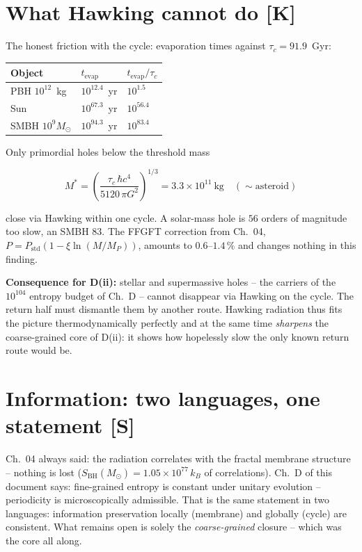 \section{What Hawking cannot do [K]}

The honest friction with the cycle: evaporation times against
$\tau_c = 91.9$~Gyr:

\begin{center}
\begin{tabular}{lll}
\toprule
Object & $t_\text{evap}$ & $t_\text{evap}/\tau_c$ \\
\midrule
PBH $10^{12}$~kg & $10^{12.4}$~yr & $10^{1.5}$ \\
Sun & $10^{67.3}$~yr & $10^{56.4}$ \\
SMBH $10^{9}M_\odot$ & $10^{94.3}$~yr & $10^{83.4}$ \\
\bottomrule
\end{tabular}
\end{center}

Only primordial holes below the threshold mass

\[
  M^{*} = \left(\frac{\tau_c\,\hbar c^4}{5120\,\pi G^2}\right)^{1/3}
  = 3.3\times10^{11}~\text{kg} \quad(\sim\text{asteroid})
\]

close via Hawking within one cycle. A solar-mass hole is $56$
orders of magnitude too slow, an SMBH $83$. The FFGFT correction
from Ch.~04, $P = P_\text{std}(1 - \xi\ln(M/M_P))$, amounts to
$0.6$--$1.4\,\%$ and changes nothing in this finding.

\textbf{Consequence for D(ii):} stellar and supermassive holes --
the carriers of the $10^{104}$ entropy budget of Ch.~D -- cannot
disappear via Hawking on the cycle. The return half must dismantle
them by another route. Hawking radiation thus fits the picture
thermodynamically perfectly and at the same time \emph{sharpens}
the coarse-grained core of D(ii): it shows how hopelessly slow the
only known return route would be.

\section{Information: two languages, one statement [S]}

Ch.~04 always said: the radiation correlates with the fractal
membrane structure -- nothing is lost
($S_\text{BH}(M_\odot) = 1.05\times10^{77}\,k_B$ of
correlations). Ch.~D of this document says: fine-grained entropy
is constant under unitary evolution -- periodicity is
microscopically admissible. That is the same statement in two
languages: information preservation locally (membrane) and
globally (cycle) are consistent. What remains open is solely the
\emph{coarse-grained} closure -- which was the core all along.

